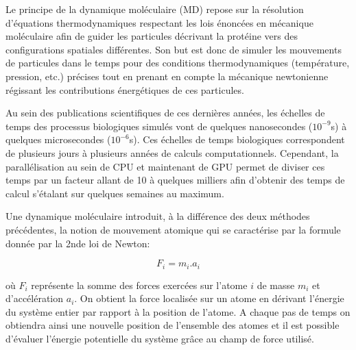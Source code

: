 
Le principe de la dynamique moléculaire (MD) repose sur la résolution d'équations thermodynamiques respectant les lois énoncées en mécanique moléculaire afin de guider les particules décrivant la protéine vers des configurations spatiales différentes. Son but est donc de simuler les mouvements de particules dans le temps pour des conditions thermodynamiques (température, pression, etc.) précises tout en prenant en compte la mécanique newtonienne régissant les contributions énergétiques de ces particules.

Au sein des publications scientifiques de ces dernières années, les échelles de temps des processus biologiques simulés vont de quelques nanosecondes ($10^{-9}$s) à quelques microsecondes ($10^{-6}$s). Ces échelles de temps biologiques correspondent de plusieurs jours à plusieurs années de calculs computationnels. Cependant, la parallélisation au sein de CPU et maintenant de GPU permet de diviser ces temps par un facteur allant de 10 à quelques milliers afin d'obtenir des temps de calcul s'étalant sur quelques semaines au maximum.

Une dynamique moléculaire introduit, à la différence des deux méthodes précédentes, la notion de mouvement atomique qui se caractérise par la formule donnée par la 2nde loi de Newton:

$$F_i = m_i.a_i$$

où $F_i$ représente la somme des forces exercées sur l'atome $i$ de masse $m_i$ et d'accélération $a_i$. On obtient la force localisée sur un atome en dérivant l'énergie du système entier par rapport à la position de l'atome. A chaque pas de temps on obtiendra ainsi une nouvelle position de l'ensemble des atomes et il est possible d'évaluer l'énergie potentielle du système grâce au champ de force utilisé.

